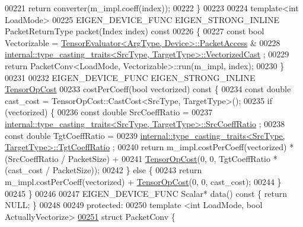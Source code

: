 \begin{DoxyCode}
00221     \textcolor{keywordflow}{return} converter(m\_impl.coeff(index));
00222   \}
00223 
00224   \textcolor{keyword}{template}<\textcolor{keywordtype}{int} LoadMode>
00225   EIGEN\_DEVICE\_FUNC EIGEN\_STRONG\_INLINE PacketReturnType packet(Index index)\textcolor{keyword}{ const}
00226 \textcolor{keyword}{  }\{
00227     \textcolor{keyword}{const} \textcolor{keywordtype}{bool} Vectorizable = \hyperlink{struct_eigen_1_1_tensor_evaluator}{TensorEvaluator<ArgType, Device>::PacketAccess}
       &
00228         \hyperlink{struct_eigen_1_1internal_1_1type__casting__traits}{internal::type\_casting\_traits<SrcType, TargetType>::VectorizedCast}
      ;
00229     \textcolor{keywordflow}{return} PacketConv<LoadMode, Vectorizable>::run(m\_impl, index);
00230   \}
00231 
00232   EIGEN\_DEVICE\_FUNC EIGEN\_STRONG\_INLINE \hyperlink{class_eigen_1_1_tensor_op_cost}{TensorOpCost}
00233   costPerCoeff(\textcolor{keywordtype}{bool} vectorized)\textcolor{keyword}{ const }\{
00234     \textcolor{keyword}{const} \textcolor{keywordtype}{double} cast\_cost = TensorOpCost::CastCost<SrcType, TargetType>();
00235     \textcolor{keywordflow}{if} (vectorized) \{
00236       \textcolor{keyword}{const} \textcolor{keywordtype}{double} SrcCoeffRatio =
00237           \hyperlink{struct_eigen_1_1internal_1_1type__casting__traits}{internal::type\_casting\_traits<SrcType, TargetType>::SrcCoeffRatio}
      ;
00238       \textcolor{keyword}{const} \textcolor{keywordtype}{double} TgtCoeffRatio =
00239           \hyperlink{struct_eigen_1_1internal_1_1type__casting__traits}{internal::type\_casting\_traits<SrcType, TargetType>::TgtCoeffRatio}
      ;
00240       \textcolor{keywordflow}{return} m\_impl.costPerCoeff(vectorized) * (SrcCoeffRatio / PacketSize) +
00241           \hyperlink{class_eigen_1_1_tensor_op_cost}{TensorOpCost}(0, 0, TgtCoeffRatio * (cast\_cost / PacketSize));
00242     \} \textcolor{keywordflow}{else} \{
00243       \textcolor{keywordflow}{return} m\_impl.costPerCoeff(vectorized) + \hyperlink{class_eigen_1_1_tensor_op_cost}{TensorOpCost}(0, 0, cast\_cost);
00244     \}
00245   \}
00246 
00247   EIGEN\_DEVICE\_FUNC Scalar* data()\textcolor{keyword}{ const }\{ \textcolor{keywordflow}{return} NULL; \}
00248 
00249   \textcolor{keyword}{protected}:
00250   \textcolor{keyword}{template} <\textcolor{keywordtype}{int} LoadMode, \textcolor{keywordtype}{bool} ActuallyVectorize>
\hyperlink{struct_eigen_1_1_tensor_evaluator_3_01const_01_tensor_conversion_op_3_01_target_type_00_01_arg_t3168668fdfbeba0eb2459f9b9de77bc7}{00251}   \textcolor{keyword}{struct }PacketConv \{

\end{DoxyCode}
